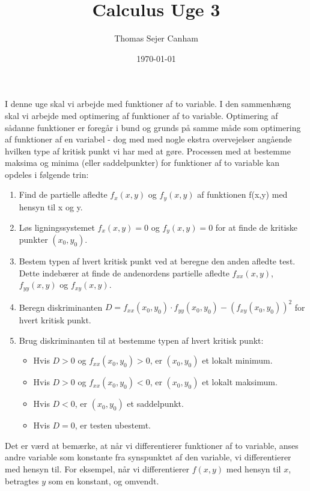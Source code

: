 \documentclass{article}
\title{Calculus Uge 3}
\author{Thomas Sejer Canham}
\date{\today}
\begin{document}
 \begin{titlepage}

    \maketitle

I denne uge skal vi arbejde med funktioner af to variable. I den sammenhæng skal vi arbejde med optimering af funktioner af to variable. Optimering af sådanne funktioner er foregår i bund og grunds på samme måde som optimering af funktioner af en variabel - dog med med nogle ekstra overvejelser angående hvilken type af kritisk punkt vi har med at gøre. Processen med at bestemme maksima og minima (eller saddelpunkter) for funktioner af to variable kan opdeles i følgende trin:

\begin{enumerate}
    \item Find de partielle afledte $f_x(x,y)$ og $f_y(x,y)$ af funktionen f(x,y) med hensyn til x og y.
    \item Løs ligningssystemet $f_x(x,y) = 0$ og $f_y(x,y) = 0$ for at finde de kritiske punkter $(x_0, y_0)$.
    \item Bestem typen af hvert kritisk punkt ved at beregne den anden afledte test. Dette indebærer at finde de andenordens partielle afledte $f_{xx}(x,y)$, $f_{yy}(x,y)$ og $f_{xy}(x,y)$.
    \item Beregn diskriminanten $D = f_{xx}(x_0,y_0) \cdot f_{yy}(x_0,y_0) - (f_{xy}(x_0,y_0))^2$ for hvert kritisk punkt.
    \item Brug diskriminanten til at bestemme typen af hvert kritisk punkt:
        \begin{itemize}
            \item Hvis $D > 0$ og $f_{xx}(x_0,y_0) > 0$, er $(x_0,y_0)$ et lokalt minimum.
            \item Hvis $D > 0$ og $f_{xx}(x_0,y_0) < 0$, er $(x_0,y_0)$ et lokalt maksimum.
            \item Hvis $D < 0$, er $(x_0,y_0)$ et saddelpunkt.
            \item Hvis $D = 0$, er testen ubestemt.
        \end{itemize}
\end{enumerate}
Det er værd at bemærke, at når vi differentierer funktioner af to variable, anses andre variable som konstante fra synspunktet af den variable, vi differentierer med hensyn til. For eksempel, når vi differentierer $f(x,y)$ med hensyn til $x$, betragtes $y$ som en konstant, og omvendt.\vspace{1em}


\end{titlepage}
\end{document}
